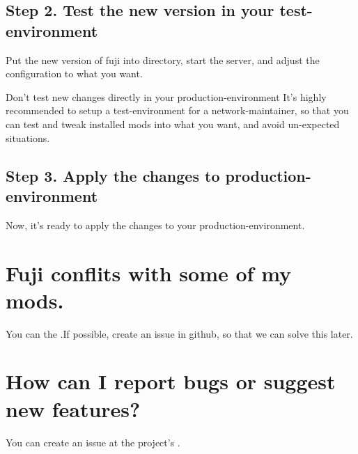 \subsection{Step 2. Test the new version in your test-environment}
Put the new version of fuji into  directory, start the server, and adjust the configuration to what you want.

\begin{warn}{Don't test new changes directly in your production-environment}
    It's highly recommended to setup a test-environment for a network-maintainer, so that you can test and tweak installed mods into what you want, and avoid un-expected situations.
\end{warn}

\subsection{Step 3. Apply the changes to production-environment}
Now, it's ready to apply the changes to your production-environment.


\section{Fuji conflits with some of my mods.}
You can  the .If possible, create an issue in github, so that we can solve this later.


\section{How can I report bugs or suggest new features?}
You can create an issue at the project's .


